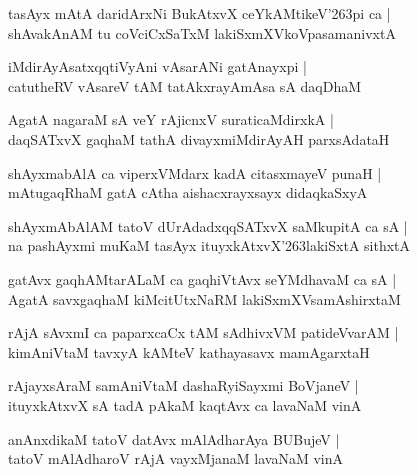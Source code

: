 \begin{shloka}
tasAyx mAtA daridArxNi BukAtxvX ceYkAMtikeV\char'263pi ca |\\
shAvakAnAM tu coVciCxSaTxM lakiSxmXVkoVpasamanivxtA 
\end{shloka}

\begin{shloka}
iMdirAyAsatxqqtiVyAni vAsarANi gatAnayxpi |\\
catutheRV vAsareV tAM tatAkxrayAmAsa sA daqDhaM 
\end{shloka}

\begin{shloka}
AgatA nagaraM sA veY rAjicnxV suraticaMdirxkA |\\
daqSATxvX gaqhaM tathA divayxmiMdirAyAH parxsAdataH
\end{shloka}

\begin{shloka}
shAyxmabAlA ca viperxVMdarx kadA citasxmayeV punaH |\\
mAtugaqRhaM gatA cAtha aishacxrayxsayx didaqkaSxyA
\end{shloka}

\begin{shloka}
shAyxmAbAlAM tatoV dUrAdadxqqSATxvX saMkupitA ca sA |\\
na pashAyxmi muKaM tasAyx ituyxkAtxvX\char'263lakiSxtA sithxtA
\end{shloka}

\begin{shloka}
gatAvx gaqhAMtarALaM ca gaqhiVtAvx seYMdhavaM ca sA |\\
AgatA savxgaqhaM kiMcitUtxNaRM lakiSxmXVsamAshirxtaM 
\end{shloka}

\begin{shloka}
rAjA sAvxmI ca paparxcaCx tAM sAdhivxVM patideVvarAM |\\
kimAniVtaM tavxyA kAMteV kathayasavx mamAgarxtaH
\end{shloka}

\begin{shloka}
rAjayxsAraM samAniVtaM dashaRyiSayxmi BoVjaneV |\\
ituyxkAtxvX sA tadA pAkaM kaqtAvx ca lavaNaM vinA
\end{shloka}

\begin{shloka}
anAnxdikaM tatoV datAvx mAlAdharAya BUBujeV |\\
tatoV mAlAdharoV rAjA vayxMjanaM lavaNaM vinA
\end{shloka}

